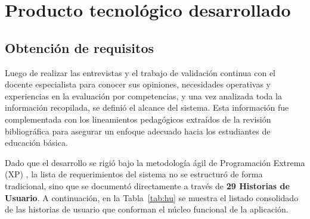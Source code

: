 
\section{Producto tecnológico desarrollado}

\subsection{Obtención de requisitos}
Luego de realizar las entrevistas y el trabajo de validación continua con el docente especialista para conocer sus opiniones, necesidades operativas y experiencias en la evaluación por competencias, y una vez analizada toda la información recopilada, se definió el alcance del sistema. Esta información fue complementada con los lineamientos pedagógicos extraídos de la revisión bibliográfica para asegurar un enfoque adecuado hacia los estudiantes de educación básica.

Dado que el desarrollo se rigió bajo la metodología ágil de Programación Extrema (XP) \cite{beck2004xp}, la lista de requerimientos del sistema no se estructuró de forma tradicional, sino que se documentó directamente a través de \textbf{29 Historias de Usuario}. A continuación, en la Tabla~\ref{tab:hu} se muestra el listado consolidado de las historias de usuario que conforman el núcleo funcional de la aplicación.

